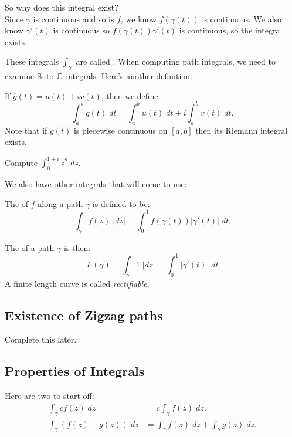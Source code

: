 \documentclass[notes]{subfile}
\begin{document}
So why does this integral exist?\\

Since $\gamma$ is continuous and so is $f$, we know $f(\gamma(t))$
is continuous.
We also know $\gamma'(t)$ is continuous so $f(\gamma(t))\gamma'(t)$
is continuous, so the integral exists.

These integrals $\int_{\gamma}$ are called .
When computing path integrals, we need to examine $\R$ to $\C$ 
integrals.  Here's another definition.

\begin{definition}[$\R$ to $\C$ integrals]
    If $g(t) = u(t) + iv(t)$, then we define
    \[ \int_a^b g(t) \; dt = \int_a^b u(t) \; dt + i
    \int_a^b v(t) \; dt. \]
    Note that if $g(t)$ is piecewise continuous on $[a,b]$
    then its Riemann integral exists.
\end{definition}

\begin{exercise}
    Compute $\int_0^{1+i} z^2 \; dz$.
\end{exercise}

We also have other integrals that will come to use:
\begin{definition}
    The  of $f$ along a path $\gamma$ is
    defined to be:
    \[ \int_{\gamma} f(z) \; |dz| = \int_0^1 f(\gamma(t)) 
    |\gamma'(t)| \; dt. \]
\end{definition}

The  of a path $\gamma$ is then:
\[ L(\gamma) = \int_{\gamma} 1 \; |dz| = \int_0^1 |\gamma'(t)| \; dt\]
A finite length curve is called \textit{rectifiable}.

\subsection{Existence of Zigzag paths}
Complete this later.



\subsection{Properties of Integrals}
Here are two to start off:
\begin{align}
    \int_{\gamma} cf(z) \; dz &= c \int_{\gamma} f(z) \; dz. \\
    \int_{\gamma} (f(z) + g(z)) \; dz &=
        \int_{\gamma} f(z) \; dz + \int_{\gamma} g(z) \; dz.
\end{align}
\end{document}
